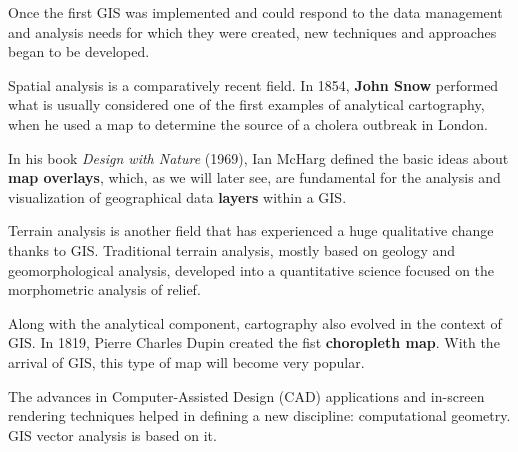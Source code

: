 Once the first GIS was implemented and could respond to the data management and analysis needs for which they were created, new techniques and approaches began to be developed. 

Spatial analysis is a comparatively recent field. In 1854, \textbf{John Snow} performed what is usually considered one of the first examples of analytical cartography, when he used a map to determine the source of a cholera outbreak in London.

In his book \emph{Design with Nature} (1969), Ian McHarg defined the basic ideas about  \textbf{map overlays}, which, as we will later see, are fundamental for the analysis and visualization of geographical data \textbf{layers} within a GIS.

Terrain analysis is another field that has experienced a huge qualitative change thanks to GIS. Traditional terrain analysis, mostly based on geology and geomorphological analysis, developed into a quantitative science focused on the morphometric analysis of relief.

Along with the analytical component, cartography also evolved in the context of GIS. In 1819, Pierre Charles Dupin created the fist \textbf{choropleth map}. With the arrival of GIS, this type of map will become very popular.

The advances in Computer-Assisted Design (CAD) applications and in-screen rendering techniques helped in defining a new discipline: computational geometry. GIS vector analysis is based on it.

\pagestyle{empty}

